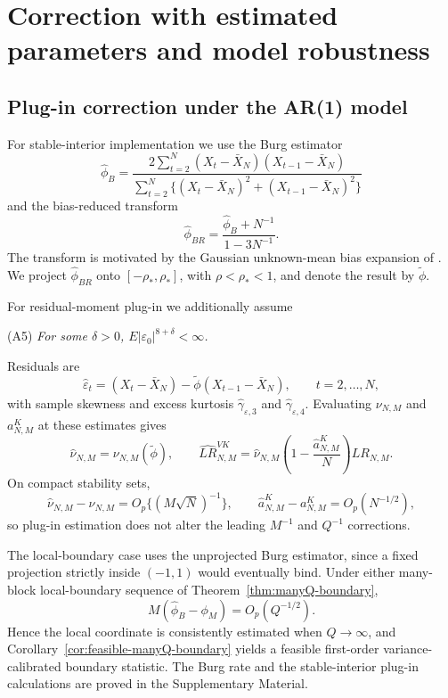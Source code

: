 \documentclass[12pt]{article}
\theoremstyle{remark}
\begin{document}
\section{Correction with estimated parameters and model robustness}
\label{sec:estimated-robustness}

\subsection{Plug-in correction under the AR(1) model}
\label{sec:implementation}

For stable-interior implementation we use the Burg estimator \citep{Burg:1968}
\[
\widehat\phi_B
=
\frac{
2\sum_{t=2}^N(X_t-\bar X_N)(X_{t-1}-\bar X_N)
}{
\sum_{t=2}^N\{(X_t-\bar X_N)^2+(X_{t-1}-\bar X_N)^2\}
}
\]
and the bias-reduced transform
\[
\widehat\phi_{BR}
=
\frac{\widehat\phi_B+N^{-1}}{1-3N^{-1}}.
\]
The transform is motivated by the Gaussian unknown-mean bias expansion of \citet{Zhang.McLeod:2006}. We project $\widehat\phi_{BR}$ onto $[-\rho_*,\rho_*]$, with $\rho<\rho_*<1$, and denote the result by $\widetilde\phi$.

For residual-moment plug-in we additionally assume

\medskip
\noindent\textnormal{(A5)} \textit{For some $\delta>0$, $E|\varepsilon_0|^{8+\delta}<\infty$.}
\medskip

Residuals are
\[
\widehat\varepsilon_t
=
(X_t-\bar X_N)
-\widetilde\phi(X_{t-1}-\bar X_N),
\qquad t=2,\ldots,N,
\]
with sample skewness and excess kurtosis
$\widehat\gamma_{\varepsilon,3}$ and
$\widehat\gamma_{\varepsilon,4}$. Evaluating
$\nu_{N,M}$ and $a^K_{N,M}$ at these estimates gives
\begin{equation}
\widehat\nu_{N,M}
=
\nu_{N,M}(\widetilde\phi),
\qquad
\widehat{LR}^{VK}_{N,M}
=
\widehat\nu_{N,M}
\left(1-\frac{\widehat a^K_{N,M}}{N}\right)
LR_{N,M}.
\label{eq:plugin-full-statistic}
\end{equation}
On compact stability sets,
\[
\widehat\nu_{N,M}-\nu_{N,M}
=
O_p\{(M\sqrt N)^{-1}\},
\qquad
\widehat a^K_{N,M}-a^K_{N,M}
=
O_p(N^{-1/2}),
\]
so plug-in estimation does not alter the leading $M^{-1}$ and $Q^{-1}$ corrections.

The local-boundary case uses the unprojected Burg estimator, since a fixed projection strictly inside $(-1,1)$ would eventually bind. Under either many-block local-boundary sequence of Theorem~\ref{thm:manyQ-boundary},
\[
M(\widehat\phi_B-\phi_M)
=
O_p(Q^{-1/2}).
\]
Hence the local coordinate is consistently estimated when $Q\to\infty$, and Corollary~\ref{cor:feasible-manyQ-boundary} yields a feasible first-order variance-calibrated boundary statistic. The Burg rate and the stable-interior plug-in calculations are proved in the Supplementary Material.
\end{document}

